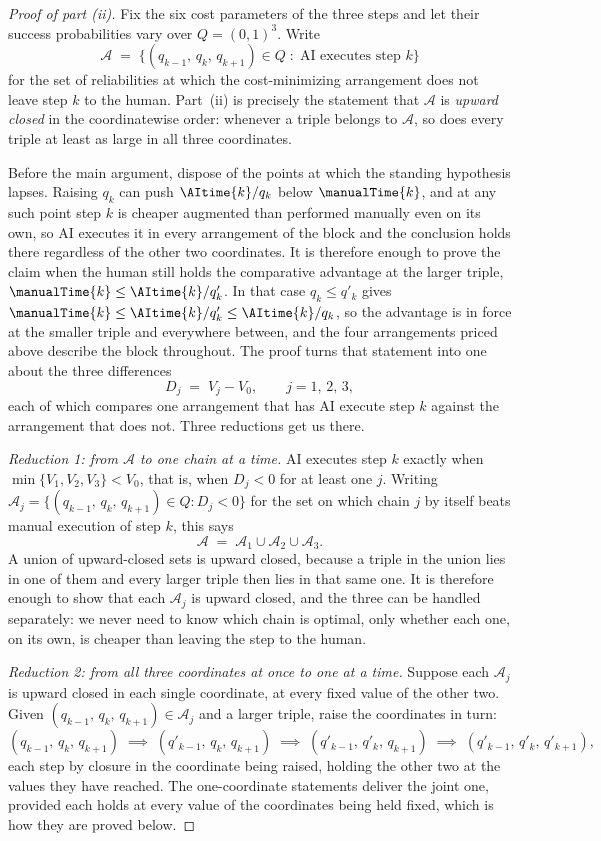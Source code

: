 \begin{proof}[Proof of part (ii)]
Fix the six cost parameters of the three steps and let their success probabilities vary over $Q = (0,1)^3$.
Write
\[ \mathcal{A} \;=\; \bigl\{ (q_{k-1},\, q_k,\, q_{k+1}) \in Q \; : \; \text{AI executes step } k \bigr\} \]
for the set of reliabilities at which the cost-minimizing arrangement does not leave step $k$ to the human.
Part~(ii) is precisely the statement that $\mathcal{A}$ is \emph{upward closed} in the coordinatewise order: whenever a triple belongs to $\mathcal{A}$, so does every triple at least as large in all three coordinates.

Before the main argument, dispose of the points at which the standing hypothesis lapses.
Raising $q_k$ can push $\AItime{k}/q_k$ below $\manualTime{k}$, and at any such point step $k$ is cheaper augmented than performed manually even on its own, so AI executes it in every arrangement of the block and the conclusion holds there regardless of the other two coordinates.
It is therefore enough to prove the claim when the human still holds the comparative advantage at the larger triple, $\manualTime{k} \leq \AItime{k}/q'_k$.
In that case $q_k \leq q'_k$ gives $\manualTime{k} \leq \AItime{k}/q'_k \leq \AItime{k}/q_k$, so the advantage is in force at the smaller triple and everywhere between, and the four arrangements priced above describe the block throughout.
The proof turns that statement into one about the three differences
\[ D_j \;=\; V_j - V_0, \qquad j = 1,\, 2,\, 3, \]
each of which compares one arrangement that has AI execute step $k$ against the arrangement that does not.
Three reductions get us there.

\emph{Reduction 1: from $\mathcal{A}$ to one chain at a time.}
AI executes step $k$ exactly when $\min\{V_1, V_2, V_3\} < V_0$, that is, when $D_j < 0$ for at least one $j$.
Writing $\mathcal{A}_j = \{(q_{k-1},\, q_k,\, q_{k+1}) \in Q : D_j < 0\}$ for the set on which chain $j$ by itself beats manual execution of step $k$, this says
\[ \mathcal{A} \;=\; \mathcal{A}_1 \cup \mathcal{A}_2 \cup \mathcal{A}_3 . \]
A union of upward-closed sets is upward closed, because a triple in the union lies in one of them and every larger triple then lies in that same one.
It is therefore enough to show that each $\mathcal{A}_j$ is upward closed, and the three can be handled separately: we never need to know which chain is optimal, only whether each one, on its own, is cheaper than leaving the step to the human.

\emph{Reduction 2: from all three coordinates at once to one at a time.}
Suppose each $\mathcal{A}_j$ is upward closed in each single coordinate, at every fixed value of the other two.
Given $(q_{k-1},\, q_k,\, q_{k+1}) \in \mathcal{A}_j$ and a larger triple, raise the coordinates in turn:
\[ (q_{k-1},\, q_k,\, q_{k+1}) \;\implies\; (q'_{k-1},\, q_k,\, q_{k+1}) \;\implies\; (q'_{k-1},\, q'_k,\, q_{k+1}) \;\implies\; (q'_{k-1},\, q'_k,\, q'_{k+1}) , \]
each step by closure in the coordinate being raised, holding the other two at the values they have reached.
The one-coordinate statements deliver the joint one, provided each holds at every value of the coordinates being held fixed, which is how they are proved below.


\end{proof}
